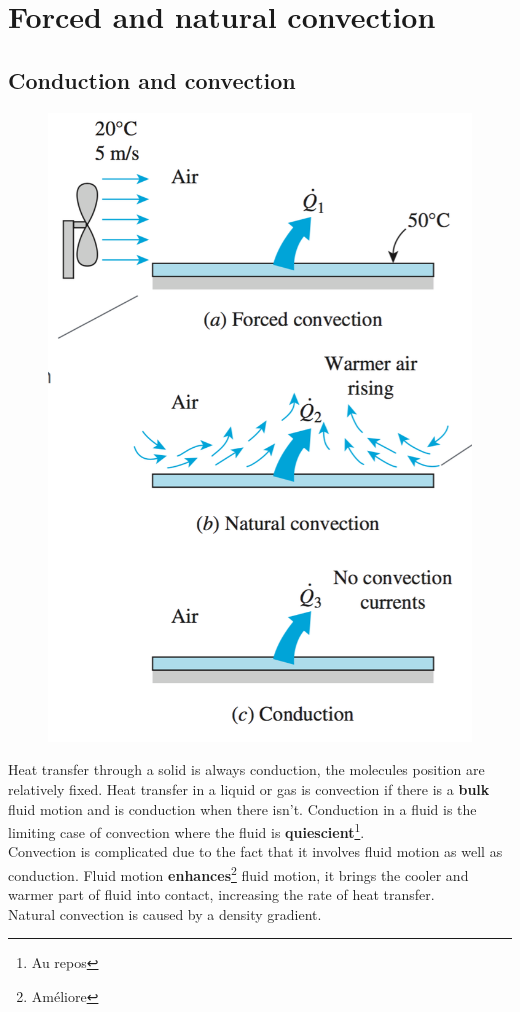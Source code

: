 
\chapter{Forced and natural convection}
\section{Conduction and convection}
	\begin{figure}
	\vspace{-5mm}
	\includegraphics[scale=0.25]{ch5/1}
	\end{figure}	
	Heat transfer through a solid is always conduction, the molecules position are relatively fixed. Heat transfer in a liquid or gas is convection if there is a \textbf{bulk} fluid motion and is conduction when there isn't. Conduction in a fluid is the limiting case of convection where the fluid is \textbf{quiescient}\footnote{Au repos}.  \\
	Convection is complicated due to the fact that it involves fluid motion as well as conduction. Fluid motion \textbf{enhances}\footnote{Améliore} fluid motion, it brings the cooler and warmer part of fluid into contact, increasing the rate of heat transfer. \\
	Natural convection is caused by a density gradient. 


